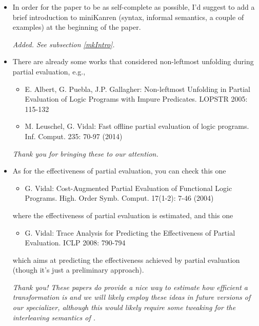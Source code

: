 \begin{itemize}
  \item In order for the paper to be as self-complete as possible, I'd suggest to add a brief introduction to miniKanren (syntax, informal semantics, a couple of examples) at the beginning of the paper.

  \emph{Added. See subsection \ref{mkIntro}.}

  \item There are already some works that considered non-leftmost unfolding during partial evaluation, e.g.,

  \begin{itemize}
    \item  E. Albert, G. Puebla, J.P. Gallagher: Non-leftmost Unfolding in Partial Evaluation of Logic Programs with Impure Predicates. LOPSTR 2005: 115-132
    \item M. Leuschel, G. Vidal: Fast offline partial evaluation of logic programs. Inf. Comput. 235: 70-97 (2014)
  \end{itemize}

  \emph{Thank you for bringing these to our attention. }

  \item As for the effectiveness of partial evaluation, you can check this one

  \begin{itemize}
    \item G. Vidal: Cost-Augmented Partial Evaluation of Functional Logic Programs. High. Order Symb. Comput. 17(1-2): 7-46 (2004)
  \end{itemize}

  where the effectiveness of partial evaluation is estimated, and this one

  \begin{itemize}
    \item G. Vidal: Trace Analysis for Predicting the Effectiveness of Partial Evaluation. ICLP 2008: 790-794
  \end{itemize}

  which aims at predicting the effectiveness achieved by partial evaluation
  (though it's just a preliminary approach).

  \emph{Thank you! These papers do provide a nice way to estimate how efficient a transformation is and we will likely employ these ideas in future versions of our specializer, although this would likely require some tweaking for the interleaving semantics of \mk. }


\end{itemize}
